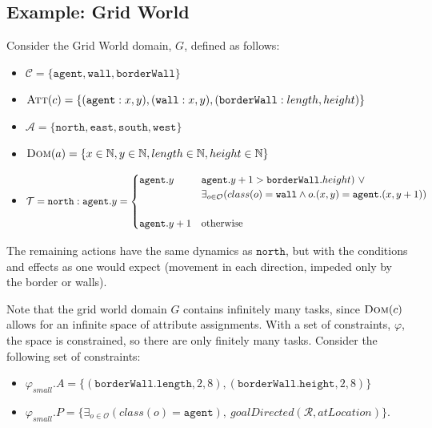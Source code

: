 \documentclass[11pt]{article}
\begin{document}
\subsection{Example: Grid World}

 Consider the Grid World domain, $G$, defined as follows:
\begin{itemize}
\item $\mathcal{C} = \{\texttt{agent}, \texttt{wall}, \texttt{borderWall}\}$
\item $\textsc{Att}(c) = \{(\texttt{agent} : x, y), (\texttt{wall} : x, y), (\texttt{borderWall} : length, height)\}$
\item $\mathcal{A} = \{\texttt{north}, \texttt{east}, \texttt{south}, \texttt{west}\}$
\item $\textsc{Dom}(a) = \{x \in \mathbb{N}, y \in \mathbb{N},  length \in \mathbb{N}, height \in \mathbb{N}\}$
\item $\mathcal{T} = \\
\texttt{north} : \texttt{agent}.y = \begin{cases}
\texttt{agent}.y& \texttt{agent}.y + 1 > \texttt{borderWall}.height)\ \vee \\ & \exists_{o \in \mathcal{O}} (class(o) = \texttt{wall} \wedge o.(x,y) = \texttt{agent}.(x,y+1)) \\ \\
\texttt{agent}.y + 1 &\text{otherwise}
\end{cases}$
\end{itemize}

The remaining actions have the same dynamics as $\texttt{north}$, but with the conditions and effects as one would expect (movement in each direction, impeded only by the border or walls).

Note that the grid world domain $G$ contains infinitely many tasks, since $\textsc{Dom}(c)$ allows for an infinite space of attribute assignments. With a set of constraints, $\varphi$, the space is constrained, so there are only finitely many tasks. Consider the following set of constraints:

\begin{itemize}
\item $\varphi_{small}.A = \{ (\texttt{borderWall.length}, 2, 8), (\texttt{borderWall.height}, 2, 8) \}$
\item $\varphi_{small}.P = \{\exists_{o \in \mathcal{O}} \left(class(o) = \texttt{agent}\right),\ goalDirected(\mathcal{R}, atLocation)\}$.
\end{itemize}
\end{document}
